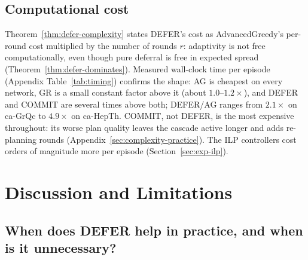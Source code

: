 \documentclass[preprint,11pt]{elsarticle}
\theoremstyle{definition}
\theoremstyle{remark}
\begin{document}
\subsection{Computational cost}\label{sec:complexity-comparison}

Theorem~\ref{thm:defer-complexity} states DEFER's cost as AdvancedGreedy's per-round cost multiplied by the number of rounds $r$: adaptivity is not free computationally, even though pure deferral is free in expected spread (Theorem~\ref{thm:defer-dominates}). Measured wall-clock time per episode (Appendix Table~\ref{tab:timing}) confirms the shape: AG is cheapest on every network, GR is a small constant factor above it (about $1.0$--$1.2\times$), and DEFER and COMMIT are several times above both; DEFER/AG ranges from $2.1\times$ on ca-GrQc to $4.9\times$ on ca-HepTh. COMMIT, not DEFER, is the most expensive throughout: its worse plan quality leaves the cascade active longer and adds re-planning rounds (Appendix~\ref{sec:complexity-practice}). The ILP controllers cost orders of magnitude more per episode (Section~\ref{sec:exp-ilp}).

\section{Discussion and Limitations}\label{sec:discussion}
\subsection{When does DEFER help in practice, and when is it unnecessary?}
\end{document}
